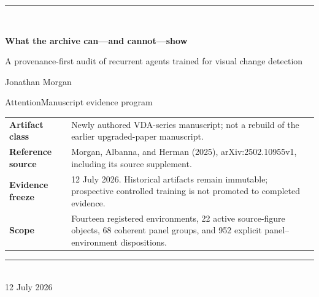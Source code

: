 \documentclass[11pt,a4paper]{article}
\begin{document}
\begin{titlepage}
\thispagestyle{empty}
\vspace*{18mm}
{\color{VdaBlue}\rule{\textwidth}{2.2pt}}\\[10mm]
{\fontsize{28}{33}\selectfont\bfseries What the archive can---and cannot---show\par}
\vspace{5mm}
{\fontsize{17}{22}\selectfont A provenance-first audit of recurrent agents trained for visual change detection\par}
\vspace{16mm}
{\large Jonathan Morgan\par}
\vspace{2mm}
{\normalsize AttentionManuscript evidence program\par}
\vfill
\begin{tabularx}{\textwidth}{@{}lY@{}}
\toprule
\textbf{Artifact class} & Newly authored VDA-series manuscript; not a rebuild of the earlier upgraded-paper manuscript.\\
\textbf{Reference source} & Morgan, Albanna, and Herman (2025), arXiv:2502.10955v1, including its source supplement.\\
\textbf{Evidence freeze} & 12 July 2026. Historical artifacts remain immutable; prospective controlled training is not promoted to completed evidence.\\
\textbf{Scope} & Fourteen registered environments, 22 active source-figure objects, 68 coherent panel groups, and 952 explicit panel--environment dispositions.\\
\bottomrule
\end{tabularx}
\vfill
{\color{VdaBlue}\rule{\textwidth}{2.2pt}}\\[3mm]
{\small 12 July 2026}
\end{titlepage}
\end{document}
